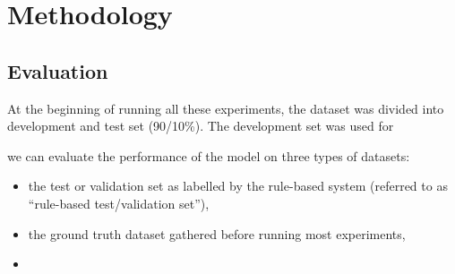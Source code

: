 \chapter{Methodology}

\section{Evaluation}
\label{evaluation}

At the beginning of running all these experiments, the dataset was divided into development and test set (90/10\%).
The development set was used for


 we can evaluate the performance of the model on three types of datasets:

\begin{itemize}
  \item the test or validation set as labelled by the rule-based system (referred to as ``rule-based test/validation set''),
  \item the ground truth dataset gathered  before running most experiments,
  \item
\end{itemize}
